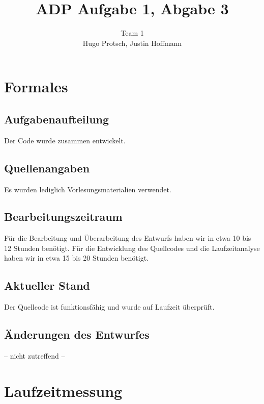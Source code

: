 \documentclass[11pt]{article}
\title{ADP Aufgabe 1, Abgabe 3}
\author{Team 1\\Hugo Protsch, Justin Hoffmann}
\begin{document}
    \maketitle


    \section{Formales}\label{sec:Formales}


    \subsection{Aufgabenaufteilung}
    Der Code wurde zusammen entwickelt.

    \subsection{Quellenangaben}

    Es wurden lediglich Vorlesungsmaterialien verwendet.


    \subsection{Bearbeitungszeitraum}
    Für die Bearbeitung und Überarbeitung des Entwurfs haben wir in etwa 10 bis
    12 Stunden benötigt.
    Für die Entwicklung des Quellcodes und die Laufzeitanalyse haben wir in
    etwa 15 bis 20 Stunden benötigt.

    \subsection{Aktueller Stand}
    Der Quellcode ist funktionsfähig und wurde auf Laufzeit überprüft.


    \subsection{Änderungen des Entwurfes}
    -- nicht zutreffend --


    \section{Laufzeitmessung}\label{sec:laufzeitmessung}
    
\end{document}
